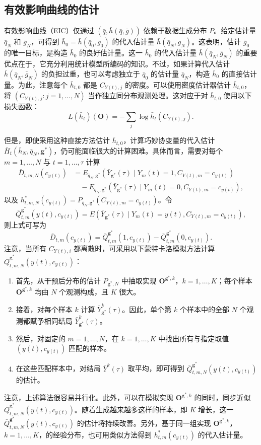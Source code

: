 \subsection{有效影响曲线的估计}

有效影响曲线（EIC）仅通过 $(\bar q,\bar h(\bar q,\bar g))$ 依赖于数据生成分布 $P$。给定估计量 $\bar q_N$ 和 $\bar g_N$，可得到 $\bar h_0=\bar h(\bar q_0,\bar g_0)$ 的代入估计量 $\bar h(\bar q_N,g_N)$。这表明，估计 $\bar g_0$ 的唯一目标，是构造 $\bar h_0$ 的良好估计量。这一 $\bar h_0$ 的代入估计量 $\bar h(\bar q_N,\bar g_N)$ 的重要优点在于，它充分利用统计模型所编码的知识。不过，如果计算代入估计 $\bar h(\bar q_N,\bar g_N)$ 的负担过重，也可以考虑独立于 $\bar q_0$ 的估计量 $\bar q_N$，构造 $\bar h_0$ 的直接估计量。为此，注意每个 $\bar h_{t,0}$ 都是 $C_{Y(t),j}$ 的密度。可以使用密度估计器估计 $\bar h_{t,0}$，将 $(C_{Y(t),j}:j=1,\ldots,N)$ 当作独立同分布观测处理。这对应于对 $\bar h_{t,0}$ 使用以下损失函数：
\[
 L(\bar h_t)(\mathbf O)=-\sum_j\log\bar h_t(C_{Y(t),j}).
\]

但是，即使采用这种直接方法估计 $\bar h_{t,0}$，计算巧妙协变量的代入估计 $\bar H_t(\bar h_N,\bar q_N,\mathbf g^*)$，仍可能面临很大的计算困难。具体而言，需要对每个 $m=1,\ldots,N$ 与 $t=1,\ldots,\tau$ 计算
\[
\begin{aligned}
 \bar D_{t,m,N}(c_{y(t)})
 &=E_{\bar q_N,\mathbf g^*}(\bar Y_{\mathbf g^*}(\tau)\mid Y_m(t)=1,C_{Y(t),m}=c_{y(t)})\\
 &\quad{}-E_{\bar q_N,\mathbf g^*}(\bar Y_{\mathbf g^*}(\tau)\mid Y_m(t)=0,C_{Y(t),m}=c_{y(t)}),
\end{aligned}
\]
以及 $h^*_{t,m,N}(c_{y(t)})=P_{\bar q_N,\mathbf g^*}(C_{Y(t),m}=c_{y(t)})$。令
\[
 \bar Q^{\mathbf g^*}_{t,m}(y(t),c_{y(t)})
 =E(\bar Y_{\mathbf g^*}(\tau)\mid Y_m(t)=y(t),C_{Y(t),m}=c_{y(t)}),
\]
则上式可写为
\[
 \bar D_{t,m}(c_{y(t)})
 =\bar Q^{\mathbf g^*}_{t,m}(1,c_{y(t)})-\bar Q^{\mathbf g^*}_{t,m}(0,c_{y(t)}).
\]
注意，当所有 $C_{Y(t),i}$ 都离散时，可采用以下蒙特卡洛模拟方法计算 $\bar Q^{\mathbf g^*}_{t,m,N}(y(t),c_{y(t)})$：
\begin{enumerate}
 \item 首先，从干预后分布的估计 $P_{\mathbf g^*,N}$ 中抽取实现 $\mathbf O^{\mathbf g^*,k}$，$k=1,\ldots,K$；每个样本 $\mathbf O^{\mathbf g^*,k}$ 均由 $N$ 个观测构成，且 $K$ 很大。
 \item 接着，对每个样本 $k$ 计算 $\bar Y^k_{\mathbf g^*}(\tau)$。因此，单个第 $k$ 个样本中的全部 $N$ 个观测都赋予相同结局 $\bar Y^k_{\mathbf g^*}(\tau)$。
 \item 然后，对固定的 $m=1,\ldots,N$，在 $k=1,\ldots,K$ 中找出所有与指定取值 $(y(t),c_{y(t)})$ 匹配的样本。
 \item 在这些匹配样本中，对结局 $\bar Y^k(\tau)$ 取平均，即可得到 $\bar Q^{\mathbf g^*}_{t,m,N}(y(t),c_{y(t)})$ 的估计。
\end{enumerate}
注意，上述算法很容易并行化。此外，可以在模拟实现 $\mathbf O^{\mathbf g^*,k}$ 的同时，同步近似 $\bar Q^{\mathbf g^*}_{t,m,N}(y(t),c_{y(t)})$。随着生成越来越多这样的样本，即 $K$ 增长，这一 $\bar Q^{\mathbf g^*}_{t,m,N}(y(t),c_{y(t)})$ 的估计将持续改善。另外，基于同一组实现 $\mathbf O^{\mathbf g^*,k}$，$k=1,\ldots,K$，的经验分布，也可用类似方法得到 $h^*_{t,m}(c_{y(t)})$ 的代入估计量。

